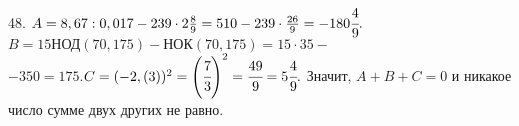 48. $A=8,67:0,017-239\cdot2\frac{8}{9}=510-239\cdot\frac{26}{9}=-180\cfrac{4}{9}.$ $B=15\text{НОД}(70, 175)-\text{НОК}(70,175)=15\cdot35-$\\$-350=175.$$C=(-2,(3))^2=\left(\cfrac{7}{3}\right)^2=\cfrac{49}{9}=5\cfrac{4}{9}.$ Значит, $A+B+C=0$ и никакое число сумме двух других не равно.\\
